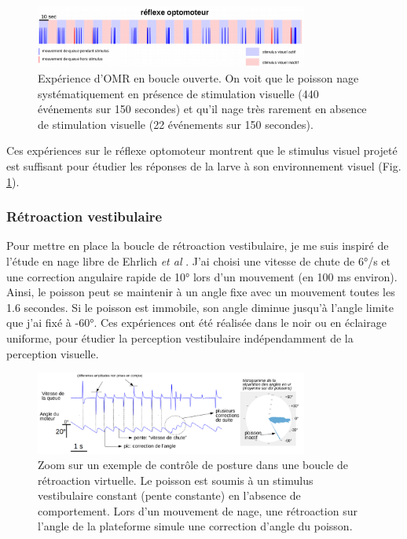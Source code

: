 
\begin{figure}
\centering
\includegraphics[width=0.8\textwidth]{./files/omr.png}
\caption{Expérience d'OMR en boucle ouverte. On voit que le poisson nage systématiquement en présence de stimulation visuelle (440 événements sur 150 secondes) et qu'il nage très rarement en absence de stimulation visuelle (22 événements sur 150 secondes).}
\label{FigOMRopenloop}
\end{figure}

Ces expériences sur le réflexe optomoteur montrent que le stimulus visuel projeté est suffisant pour étudier les réponses de la larve à son environnement visuel (Fig. \ref{FigOMRopenloop}).

\subsubsection{Rétroaction vestibulaire}
Pour mettre en place la boucle de rétroaction vestibulaire, je me suis inspiré de l'étude en nage libre de Ehrlich \emph{et al} \cite{ehrlich_control_2017}. J'ai choisi une vitesse de chute de 6°/s et une correction angulaire rapide de 10° lors d'un mouvement (en 100 ms environ). Ainsi, le poisson peut se maintenir à un angle fixe avec un mouvement toutes les 1.6 secondes. Si le poisson est immobile, son angle diminue jusqu'à l'angle limite que j'ai fixé à -60°. Ces expériences ont été réalisée dans le noir ou en éclairage uniforme, pour étudier la perception vestibulaire indépendamment de la perception visuelle.

\begin{figure}
\centering
\includegraphics[width=0.8\textwidth]{./files/vestibular_feedback.svg.png}
\caption{Zoom sur un exemple de contrôle de posture dans une boucle de rétroaction virtuelle. Le poisson est soumis à un stimulus vestibulaire constant (pente constante) en l'absence de comportement. Lors d'un mouvement de nage, une rétroaction sur l'angle de la plateforme simule une correction d'angle du poisson.}
\end{figure}

